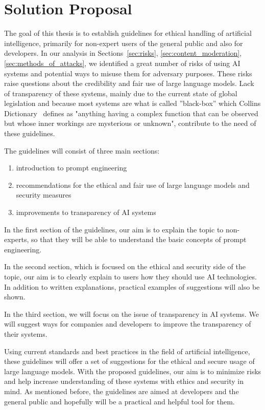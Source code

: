 \chapter{Solution Proposal}

The goal of this thesis is to establish guidelines for ethical handling of artificial intelligence, primarily for non-expert users of the general public and also for developers. In our analysis in Sections~\ref{sec:risks}, \ref{sec:content_moderation}, \ref{sec:methods_of_attacks}, we identified a great number of risks of using AI systems and potential ways to misuse them for adversary purposes. These risks raise questions about the credibility and fair use of large language models. Lack of transparency of these systems, mainly due to the current state of global legislation and because most systems are what is called ''black-box'' which Collins Dictionary~\cite{Collins_BlackBox} defines as "anything having a complex function that can be observed but whose inner workings are mysterious or unknown", contribute to the need of these guidelines.

The guidelines will consist of three main sections:
\begin{enumerate}
    \item introduction to prompt engineering
    \item recommendations for the ethical and fair use of large language models and security measures
    \item improvements to transparency of AI systems %
\end{enumerate}

In the first section of the guidelines, our aim is to explain the topic to non-experts, so that they will be able to understand the basic concepts of prompt engineering.

In the second section, which is focused on the ethical and security side of the topic, our aim is to clearly explain to users how they should use AI technologies. In addition to written explanations, practical examples of suggestions will also be shown.

In the third section, we will focus on the issue of transparency in AI systems. We will suggest ways for companies and developers to improve the transparency of their systems.

Using current standards and best practices in the field of artificial intelligence, these guidelines will offer a set of suggestions for the ethical and secure usage of large language models. With the proposed guidelines, our aim is to minimize risks and help increase understanding of these systems with ethics and security in mind. As mentioned before, the guidelines are aimed at developers and the general public and hopefully will be a practical and helpful tool for them.
